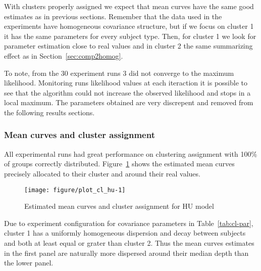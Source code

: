 With clusters properly assigned we expect that mean curves have the same good estimates as in previous sections. Remember that the data used in the experiments have homogeneous covariance structure, but if we focus on cluster 1 it has the same parameters for every subject type. Then, for cluster 1 we look for parameter estimation close to real values and in cluster 2 the same summarizing effect as in Section~\ref{sec:comp2homog}.


To note, from the 30 experiment runs 3 did not converge to the maximum likelihood. Monitoring runs likelihood values at each iteraction it is possible to see that the algorithm could not increase the observed likelihood and stops in a local maximum. The parameters obtained are very discrepent and removed from the following results sections.


\subsubsection{Mean curves and cluster assignment}
\label{sec:simu-cl-fit-hu}

All experimental runs had great performance on clustering assignment with 100\% of groups correctly distributed. Figure~\ref{fig:cl-hu} shows the estimated mean curves precisely allocated to their cluster and around their real values. 


\begin{figure}[t]
  \centering
\begin{knitrout}
\color{fgcolor}
\texttt{[image: figure/plot\_cl\_hu-1]} 

\end{knitrout}
  \caption{Estimated mean curves and cluster assignment for HU model}
  \label{fig:cl-hu}
\end{figure}

Due to experiment configuration for covariance parameters in Table~\ref{tab:cl-par}, cluster 1 has a uniformly homogeneous dispersion and decay between subjects and both at least equal or grater than cluster 2. Thus the mean curves estimates in the first panel are naturally more dispersed around their median depth than the lower panel.


